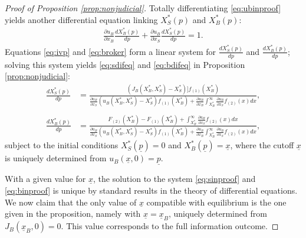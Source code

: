 \documentclass[11pt,twopage]{article}
\begin{document}
\begin{proof}[Proof of Proposition \ref{prop:nonjudicial}]
Totally differentiating \eqref{eq:ubinproof} yields another differential equation linking $X_S^*(p)$ and $X_B^*(p)$:
 \begin{align} 
\frac{\partial u_B}{\partial x_B}\frac{d X_B^*(p)}{dp}
+ \frac{\partial u_B}{\partial x_S}\frac{d X_S^*(p)}{dp}= 1.
\label{eq:broker}
\end{align} 
Equations \eqref{eq:ivp} and \eqref{eq:broker} form a linear system for $\frac{dX_S^*(p)}{dp}$ and $\frac{dX_B^*(p)}{dp}$; solving this system yields \eqref{eq:sdifeq} and \eqref{eq:bdifeq} in Proposition \ref{prop:nonjudicial}:  \begin{align}
 \frac{d X_S^*(p)}{dp}&= 
  \frac{(J_B(X_B^*,X_S^*)-X_S^*)]f_{(1)}(X_B^*)}{
  \frac{\partial u_B}{\partial x_S}
   (u_B(X_B^*,X_S^*)-X_S^*)f_{(1)}(X_B^*)+
   \frac{ \partial u_B}{\partial x_B }
    \int_{X_B^*}^\infty \frac{  \partial u_B} {\partial x_S} 
    f_{(2)}(x) dx
    }, \label{eq:sinproof}
    \\ \nonumber
    \\
  \frac{d X_B^*(p)}{dp}&= 
  \frac{  F_{(2)}(X_B^*) -  F_{(1)}(X_B^*) +  \int_{X_B^*}^\infty \frac{  \partial u_B} {\partial x_S} 
    f_{(2)}(x) dx  }{
  \frac{\partial u_B}{\partial x_S}
   (u_B(X_B^*,X_S^*)-X_S^*)f_{(1)}(X_B^*)+
   \frac{ \partial u_B}{\partial x_B }
    \int_{X_B^*}^\infty \frac{  \partial u_B} {\partial x_S} \label{eq:binproof}
    f_{(2)}(x) dx
    } ,
\end{align}
subject to the initial conditions $X_S^*(\underline p) = 0$ and $X_B^*(\underline p) = \underline x$, where the cutoff $\underline x$ is uniquely determined from  $u_B(\underline x, 0) = \underline p$.

With a given value for $\underline x$, the solution to the system \eqref{eq:sinproof} and \eqref{eq:binproof} is unique by standard results in the theory of differential equations. We now claim that the only value of $\underline x$ compatible with equilibrium is the one given in the proposition, namely with $\underline x = \underline x_B$, uniquely determined from $J_B(\underline x_B,0) = 0$. This value corresponds to the full information outcome.


\end{proof}
\end{document}

